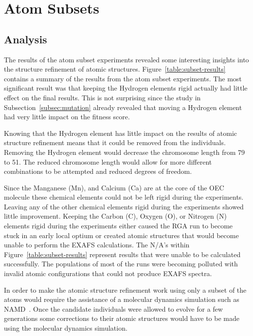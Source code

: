 \section{Atom Subsets}

\subsection{Analysis}

The results of the atom subset experiments revealed some interesting insights into the structure refinement of atomic structures. Figure~\ref{table:subset-results} contains a summary of the results from the atom subset experiments. The most significant result was that keeping the Hydrogen elements rigid actually had little effect on the final results. This is not surprising since the study in Subsection~\ref{subsec:mutation} already revealed that moving a Hydrogen element had very little impact on the fitness score.

Knowing that the Hydrogen element has little impact on the results of atomic structure refinement means that it could be removed from the individuals. Removing the Hydrogen element would decrease the chromosome length from 79 to 51. The reduced chromosome length would allow for more different combinations to be attempted and reduced degrees of freedom.

Since the Manganese (Mn), and Calcium (Ca) are at the core of the OEC molecule these chemical elements could not be left rigid during the experiments. Leaving any of the other chemical elements rigid during the experiments showed little improvement. Keeping the Carbon (C), Oxygen (O), or Nitrogen (N) elements rigid during the experiments either caused the RGA run to become stuck in an early local optium or created atomic structures that would become unable to perform the EXAFS calculations. The N/A's within Figure~\ref{table:subset-results} represent results that were unable to be calculated successfully. The populations of most of the runs were becoming polluted with invalid atomic configurations that could not produce EXAFS spectra.

In order to make the atomic structure refinement work using only a subset of the atoms would require the assistance of a molecular dynamics simulation such as NAMD~\cite{namd}. Once the candidate individuals were allowed to evolve for a few generations some corrections to their atomic structures would have to be made using the molecular dynamics simulation.

